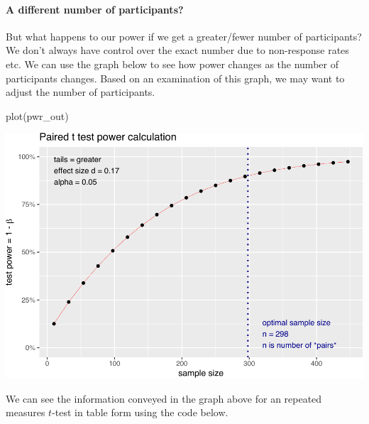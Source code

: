 \documentclass[
]{krantz}
\makeatletter
\newenvironment{Shaded}{\begin{snugshade}}{\end{snugshade}}
\newcommand{\FunctionTok}[1]{\textcolor[rgb]{0,0,0}{#1}}
\newcommand{\NormalTok}[1]{#1}
\newenvironment{kframe}{%
\medskip{}
\setlength{\fboxsep}{.8em}
 \def\at@end@of@kframe{}%
 \ifinner\ifhmode%
  \def\at@end@of@kframe{\end{minipage}}%
  \begin{minipage}{\columnwidth}%
 \fi\fi%
 \def\FrameCommand##1{\hskip\@totalleftmargin \hskip-\fboxsep
 \colorbox{shadecolor}{##1}\hskip-\fboxsep
     \hskip-\linewidth \hskip-\@totalleftmargin \hskip\columnwidth}%
 \MakeFramed {\advance\hsize-\width
   \@totalleftmargin\z@ \linewidth\hsize
   \@setminipage}}%
 {\par\unskip\endMakeFramed%
 \at@end@of@kframe}
\renewenvironment{Shaded}{\begin{kframe}}{\end{kframe}}
\makeatother
\begin{document}
\hypertarget{a-different-number-of-participants-1}{%
\paragraph{A different number of participants?}\label{a-different-number-of-participants-1}}

But what happens to our power if we get a greater/fewer number of participants? We don't always have control over the exact number due to non-response rates etc. We can use the graph below to see how power changes as the number of participants changes. Based on an examination of this graph, we may want to adjust the number of participants.

\begin{Shaded}
\begin{Highlighting}[]
\FunctionTok{plot}\NormalTok{(pwr\_out)}
\end{Highlighting}
\end{Shaded}

\includegraphics{bookdown_files/figure-latex/unnamed-chunk-250-1.pdf}

We can see the information conveyed in the graph above for an repeated measures \(t\)-test in table form using the code below.
\end{document}
